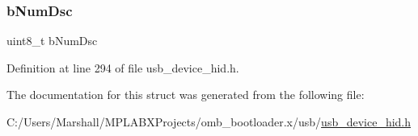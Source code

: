 \subsubsection{\texorpdfstring{bNumDsc}{bNumDsc}}
{\footnotesize\ttfamily uint8\+\_\+t b\+Num\+Dsc}



Definition at line 294 of file usb\+\_\+device\+\_\+hid.\+h.



The documentation for this struct was generated from the following file\+:\begin{DoxyCompactItemize}
\item 
C\+:/\+Users/\+Marshall/\+M\+P\+L\+A\+B\+X\+Projects/omb\+\_\+bootloader.\+x/usb/\mbox{\hyperlink{usb__device__hid_8h}{usb\+\_\+device\+\_\+hid.\+h}}\end{DoxyCompactItemize}
